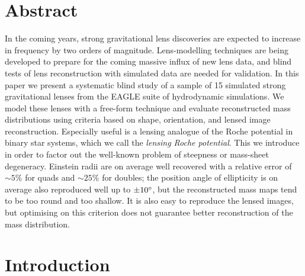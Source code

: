 
\clearpage

\section*{Abstract}
  \noindent In the coming years, strong gravitational lens discoveries
  are expected to increase in frequency by two orders of magnitude.
  Lens-modelling techniques are being developed to prepare for the
  coming massive influx of new lens data, and blind tests of lens
  reconstruction with simulated data are needed for validation.  In
  this paper we present a systematic blind study of a sample of 15
  simulated strong gravitational lenses from the EAGLE suite of
  hydrodynamic simulations.  We model these lenses with a free-form
  technique and evaluate reconstructed mass distributions using
  criteria based on shape, orientation, and lensed image
  reconstruction.  Especially useful is a lensing analogue of the
  Roche potential in binary star systems, which we call the {\em
    lensing Roche potential}.  This we introduce in order to factor
  out the well-known problem of steepness or mass-sheet degeneracy.
  Einstein radii are on average well recovered with a relative error
  of ${\sim}5\%$ for quads and ${\sim}25\%$ for doubles; the position angle of
  ellipticity is on average also reproduced well up to $\pm10^\circ$,
  but the reconstructed mass maps tend to be too round and too
  shallow.  It is also easy to reproduce the lensed images, but
  optimising on this criterion does not guarantee better
  reconstruction of the mass distribution.

\clearpage
\section{Introduction}
% 

% 

% 

% 
